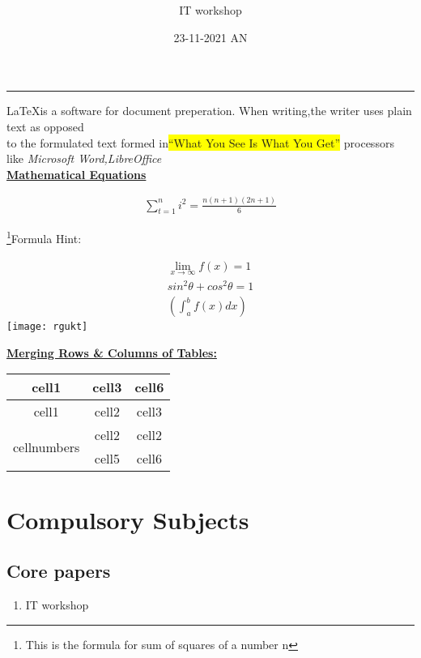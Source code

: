 \documentclass[a4paper]{article}
\title{\Large{\textbf{\color{red}{Rajiv Gandhi University of Knowledge
Technologies}}}}
\author{IT workshop}
\date{23-11-2021 AN}
\begin{document}
\maketitle
\vspace{-8mm}
\hrule
\vspace{3mm}
\hspace{2mm}
\LaTeX is a software for document preperation. When writing,the writer uses plain text as opposed\\to the formulated text formed in\colorbox{yellow}{``What You See Is What You Get''} processors like \textit{Microsoft Word,LibreOffice}
\vspace{3mm}\\
\textbf{\large{\underline{Mathematical Equations}}}
\begin{center}
\begin{eqnarray}
\sum_{t=1}^ni^2=\frac{n(n+1)(2n+1)}{6}
\end{eqnarray}
\end{center}
\begin{flushright}
\footnote{This is the formula for sum of squares of a number n}{Formula Hint:}
\end{flushright}
\vspace{-12mm}
\begin{center}
\begin{eqnarray}
\lim\limits_{x \to \infty}f(x)=1\\
sin^2\theta+cos^2\theta=1\\
\left(\int_a^bf(x)dx\right)
\end{eqnarray}
\texttt{[image: rgukt]}
\end{center}
\tableofcontents
\vspace{2mm}
\hspace{-6mm}
\textbf{\underline{Merging Rows \& Columns of Tables:}}
\vspace{3mm}\\
\begin{tabular}{|c|c|c|}
\hline
cell1 & cell3 &cell6\\
\hline
cell1 & cell2 & cell3\\
\hline
\multirow{2}{5em}{cellnumbers} & cell2 & cell2\\
\cline{2-3}
& cell5 & cell6\\
\hline
\end{tabular}
\section{Compulsory Subjects}
\subsection {Core papers}
\begin{enumerate}
\item{IT workshop}
\end{enumerate}
\end{document}
